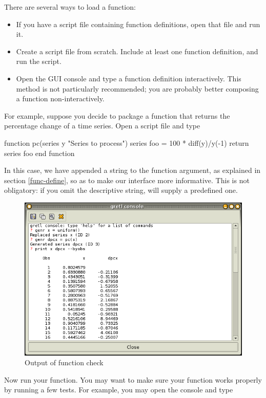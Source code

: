 There are several ways to load a function:

\begin{itemize}
\item If you have a script file containing function definitions, open
  that file and run it.
\item Create a script file from scratch.  Include at least one
  function definition, and run the script.
\item Open the GUI console and type a function definition
  interactively.  This method is not particularly recommended; you are
  probably better composing a function non-interactively.
\end{itemize}

For example, suppose you decide to package a function that returns the
percentage change of a time series. Open a script file and type
\begin{code}
function pc(series y "Series to process")
  series foo = 100 * diff(y)/y(-1)
  return series foo
end function
\end{code}
In this case, we have appended a string to the function argument, as
explained in section \ref{func-define}, so as to make our interface
more informative. This is not obligatory: if you omit the descriptive
string,  will supply a predefined one.

\begin{figure}[htbp]
  \centering
  \includegraphics[scale=0.5]{figures/func_check}
  \caption{Output of function check}
  \label{fig:func_check}
\end{figure}

Now run your function. You may want to make sure your function works
properly by running a few tests. For example, you may open the console
and type

